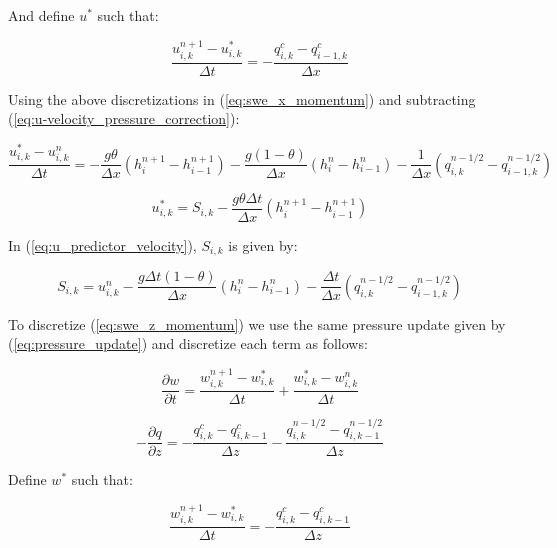 \documentclass[12pt]{article}
\begin{document}
And define $u^*$ such that:

\begin{equation} \label{eq:u-velocity_pressure_correction}
\frac{u_{i,k}^{n+1} - u_{i,k}^*}{\Delta t} = -\frac{q_{i,k}^c - q_{i-1,k}^c}{\Delta x} 
\end{equation}

Using the above discretizations in (\ref{eq:swe_x_momentum}) and subtracting (\ref{eq:u-velocity_pressure_correction}):

\begin{equation*}
\frac{u_{i,k}^* - u_{i,k}^n}{\Delta t} = - \frac{g \theta}{\Delta x} (h_{i}^{n+1}-h_{i-1}^{n+1}) - \frac{g (1-\theta)}{\Delta x} (h_{i}^n - h_{i-1}^n) - \frac{1}{\Delta x} (q_{i,k}^{n-1/2} - q_{i-1,k}^{n-1/2})
\end{equation*}

\begin{equation} \label{eq:u_predictor_velocity}
u_{i,k}^* = S_{i,k} - \frac{g \theta \Delta t}{\Delta x} (h_{i}^{n+1} - h_{i-1}^{n+1})
\end{equation}

In (\ref{eq:u_predictor_velocity}), $S_{i,k}$ is given by:

\begin{equation*}
S_{i,k} = u_{i,k}^n - \frac{g \Delta t (1-\theta)}{\Delta x} (h_{i}^n - h_{i-1}^n) - \frac{\Delta t}{\Delta x} (q_{i,k}^{n-1/2} - q_{i-1,k}^{n-1/2})
\end{equation*}

To discretize (\ref{eq:swe_z_momentum}) we use the same pressure update given by (\ref{eq:pressure_update}) and discretize each term as follows:

\begin{equation*}
\frac{\partial w}{\partial t} = \frac{w_{i,k}^{n+1} - w_{i,k}^*}{\Delta t} + \frac{w_{i,k}^* - w_{i,k}^n}{\Delta t}
\end{equation*}

\begin{equation*}
- \frac{\partial q}{\partial z} = -\frac{q_{i,k}^c - q_{i,k-1}^c}{\Delta z} - \frac{q_{i,k}^{n-1/2} - q_{i,k-1}^{n-1/2}}{\Delta z}
\end{equation*}

Define $w^*$ such that:

\begin{equation} \label{eq:w-velocity_pressure_correction}
\frac{w_{i,k}^{n+1} - w_{i,k}^*}{\Delta t} = -\frac{q_{i,k}^c - q_{i,k-1}^c}{\Delta z} 
\end{equation}
\end{document}
